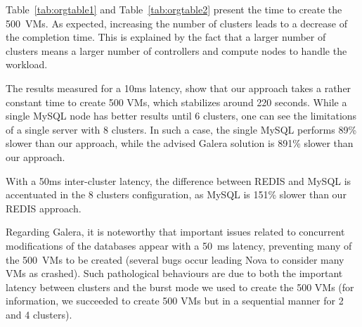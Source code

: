 Table~\ref{tab:orgtable1} and Table~\ref{tab:orgtable2} present the time to create the 500~VMs. As expected, increasing the number of clusters leads
to a decrease of the completion time.  This is explained by the fact that a larger number of clusters means a larger number of controllers and compute
nodes to handle the workload.




The results measured for a 10ms latency, show that our approach takes a rather constant time to create 500 VMs, which stabilizes around 220
seconds. While a single MySQL node has better results until 6 clusters, one can see the limitations of a single server with 8 clusters. In such a
case, the single MySQL performs 89\% slower than our approach, while the advised Galera solution is 891\% slower than our approach.

With a 50ms inter-cluster latency, the difference between REDIS and MySQL is accentuated in the 8 clusters configuration, as MySQL is 151\% slower
than our REDIS approach.
%
%
%
%

Regarding Galera, it is noteworthy that important issues related to concurrent modifications of the databases appear with a 50~ms latency, preventing
many of the 500~VMs to be created (\ie several bugs occur leading Nova to consider many VMs as crashed). Such pathological behaviours are due to
both the important latency between clusters and the burst mode we used to create the 500 VMs (for information, we succeeded to create 500 VMs but in a
sequential manner for 2 and 4 clusters).

